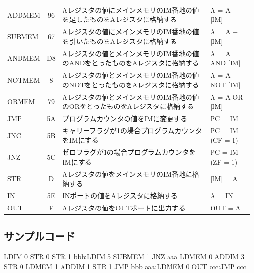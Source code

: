 \documentclass[11pt,b5paper,papersize,dvipdfmx]{jsbook}
\begin{document}
\begin{table}[htb]
\begin{tabular}{lcll}
        ADDMEM	&96	&{\scriptsize \parbox{23zw}{Aレジスタの値にメインメモリのIM番地の値を足したものをAレジスタに格納する}}	    &A =  A + [IM]\\
        SUBMEM	&67	&{\scriptsize \parbox{23zw}{Aレジスタの値にメインメモリのIM番地の値を引いたものをAレジスタに格納する}}	    &A = A $-$ [IM]\\
        ANDMEM	&D8	&{\scriptsize \parbox{23zw}{Aレジスタの値とメインメモリのIM番地の値のANDをとったものをAレジスタに格納する}}	&A = A AND [IM]\\
        NOTMEM	&8	&{\scriptsize \parbox{23zw}{Aレジスタの値とメインメモリのIM番地の値のNOTをとったものをAレジスタに格納する}}	&A = A NOT [IM]\\
        ORMEM	&79	&{\scriptsize \parbox{23zw}{Aレジスタの値とメインメモリのIM番地の値のORをとったものをAレジスタに格納する}}	&A = A OR [IM]\\
        JMP	    &5A	&{\scriptsize \parbox{23zw}{プログラムカウンタの値をIMに変更する}}	                                 &PC = IM\\
        JNC	    &5B	&{\scriptsize \parbox{23zw}{キャリーフラグが1の場合プログラムカウンタをIMにする}}	                      &PC = IM (CF = 1)\\
        JNZ	    &5C	&{\scriptsize \parbox{23zw}{ゼロフラグが1の場合プログラムカウンタをIMにする}}	                          &PC = IM (ZF = 1)\\
        STR	    &D	&{\scriptsize \parbox{23zw}{Aレジスタの値をメインメモリのIM番地に格納する}}	&[IM] = A\\
        IN	    &5E	&{\scriptsize \parbox{23zw}{INポートの値をAレジスタに格納する}}	&A = IN\\
        OUT	    &F	&{\scriptsize \parbox{23zw}{Aレジスタの値をOUTポートに出力する}}	&OUT = A\\
        \hline
    \end{tabular}
    \label{tbl:me}
\end{table}
\renewcommand{\arraystretch}{1}


\clearpage
%
\subsection{サンプルコード}
\begin{hndcode}
    LDIM 0
    STR 0  
    STR 1
bbb:LDIM 5
    SUBMEM 1
    JNZ aaa
    LDMEM 0
    ADDIM 3
    STR 0
    LDMEM 1
    ADDIM 1
    STR 1
    JMP bbb
aaa:LDMEM 0
    OUT
ccc:JMP ccc
\end{hndcode}
\end{document}
